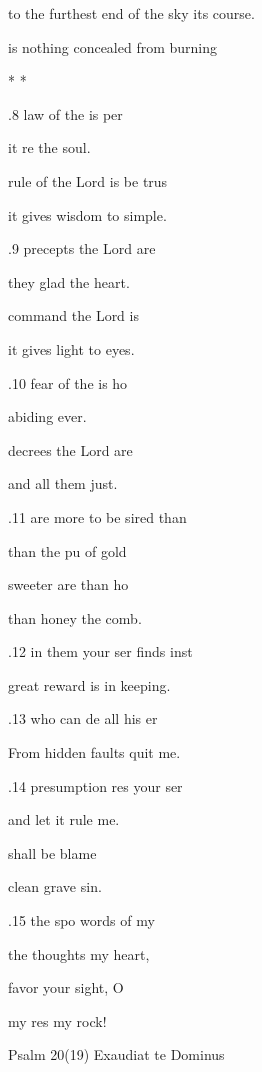 to the furthest end of the sky  its course. 

 is nothing concealed from  burning  

\pl{*} * * 

.8  law of the  is per 

it re the soul. 

 rule of the Lord is  be trus 

it gives wisdom to  simple. 

.9  precepts  the Lord are  

they glad the heart. 

 command  the Lord is  

it gives light to  eyes. 

.10  fear of the  is ho 

abiding  ever. 

 decrees  the Lord are  

and all  them just. 

.11  are more to be sired than  

than the pu of gold 

 sweeter are  than ho 

than honey  the comb. 

.12  in them your ser finds inst 

great reward is in  keeping. 

.13  who can de all his er 

From hidden faults quit me. 

.14  presumption res your ser 

and let it  rule me. 

 shall  be blame 

clean  grave sin. 

.15  the spo words of my  

the thoughts  my heart, 

 favor  your sight, O  

my res my rock! 

Psalm 20(19) Exaudiat te Dominus 


